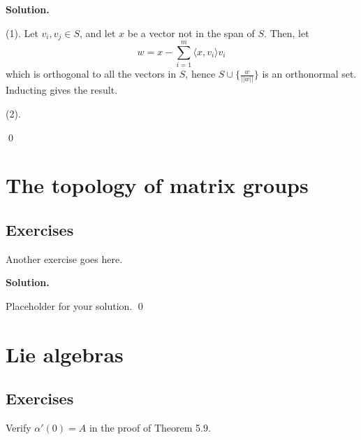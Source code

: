 \documentclass[12pt]{book}
\theoremstyle{definition}
\newenvironment{solution}
{%
  \par\noindent\textbf{Solution.}\quad
}
{%
  \qed\par
}
\begin{document}
\begin{solution}
  (1). Let $v_i, v_j \in S$, and let $x$ be a vector not in the span of $S$.
  Then, let
  \[
  w = x - \sum_{i=1}^m \langle x, v_i \rangle v_i
  \]
  which is orthogonal to all the vectors in $S$, hence $S \cup \{\frac{w}{||w||}\}$ is an orthonormal set.
  Inducting gives the result.

  (2). 

\end{solution}




\chapter{The topology of matrix groups}
\section{Exercises}

\begin{taggedexercise}[\textcolor{red}{TODO}]
Another exercise goes here.
\end{taggedexercise}

\begin{solution}
Placeholder for your solution.
\end{solution}

\chapter{Lie algebras}
\section{Exercises}

\begin{taggedexercise}[\textcolor{red}{TODO}]

\end{taggedexercise}

\begin{taggedexercise}[\textcolor{green}{Complete}]
  Verify $\alpha'(0) = A$ in the proof of Theorem 5.9.
\end{taggedexercise}
\end{document}
